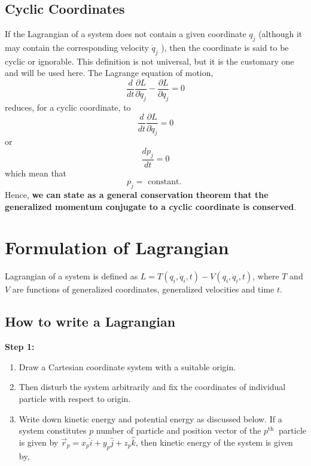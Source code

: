 \subsection{ Cyclic Coordinates}
If the Lagrangian of a system does not contain a given coordinate $q_j$ (although it may contain the corresponding velocity $\dot{q}_j$ ), then the coordinate is said to be cyclic or ignorable. This definition is not universal, but it is the customary one and will be used here. The Lagrange equation of motion,
$$
\frac{d}{d t} \frac{\partial L}{\partial \dot{q}_j}-\frac{\partial L}{\partial q_j}=0
$$
reduces, for a cyclic coordinate, to
$$
\frac{d}{d t} \frac{\partial L}{\partial \dot{q}_j}=0
$$
or
$$
\frac{d p_j}{d t}=0
$$
which mean that
$$
p_j=\text { constant. }
$$
Hence, \textbf{we can state as a general conservation theorem that the generalized momentum conjugate to a cyclic coordinate is conserved}.
\section{Formulation of Lagrangian}
Lagrangian of a system is defined as $L=T\left(q_{i}, \dot{q}_{i}, t\right)-V\left(q_{i}, \dot{q}_{i}, t\right)$, where $T$ and $V$ are functions of generalized coordinates, generalized velocities and time $t$.
\subsection{How to write a Lagrangian}
\textbf{Step 1:}
\begin{enumerate}[label=(\alph*)]
	\item  Draw a Cartesian coordinate system with a suitable origin.
	\item  Then disturb the system arbitrarily and fix the coordinates of individual particle with respect to origin.
	\item  Write down kinetic energy and potential energy as discussed below.
	If a system constitutes $p$ number of particle and position vector of the $p^{\text {th }}$ particle is given by $\vec{r}_{p}=x_{p} \hat{i}+y_{p} \hat{j}+z_{p} \hat{k}$, then kinetic energy of the system is given by,
\end{enumerate}

